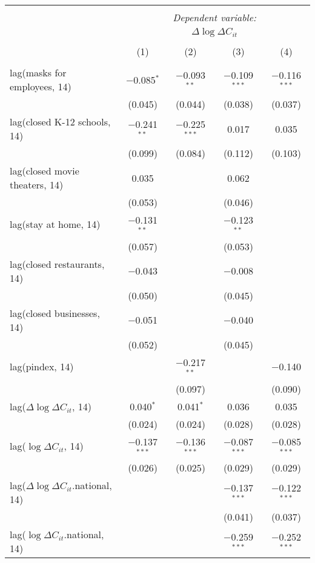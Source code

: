 \begin{tabular}{@{\extracolsep{1pt}}lcccc} 
\\[-1.8ex]\hline 
\hline \\[-1.8ex] 
 & \multicolumn{4}{c}{\textit{Dependent variable:}} \\ 
\cline{2-5} 
 & \multicolumn{4}{c}{$\Delta \log \Delta C_{it}$} \\ 
\\[-1.8ex] & (1) & (2) & (3) & (4)\\ 
\hline \\[-1.8ex] 
 lag(masks for employees, 14) & $-$0.085$^{*}$ & $-$0.093$^{**}$ & $-$0.109$^{***}$ & $-$0.116$^{***}$ \\ 
  & (0.045) & (0.044) & (0.038) & (0.037) \\ 
  lag(closed K-12 schools, 14) & $-$0.241$^{**}$ & $-$0.225$^{***}$ & 0.017 & 0.035 \\ 
  & (0.099) & (0.084) & (0.112) & (0.103) \\ 
  lag(closed movie theaters, 14) & 0.035 &  & 0.062 &  \\ 
  & (0.053) &  & (0.046) &  \\ 
  lag(stay at home, 14) & $-$0.131$^{**}$ &  & $-$0.123$^{**}$ &  \\ 
  & (0.057) &  & (0.053) &  \\ 
  lag(closed restaurants, 14) & $-$0.043 &  & $-$0.008 &  \\ 
  & (0.050) &  & (0.045) &  \\ 
  lag(closed businesses, 14) & $-$0.051 &  & $-$0.040 &  \\ 
  & (0.052) &  & (0.045) &  \\ 
  lag(pindex, 14) &  & $-$0.217$^{**}$ &  & $-$0.140 \\ 
  &  & (0.097) &  & (0.090) \\ 
  lag($\Delta \log \Delta C_{it}$, 14) & 0.040$^{*}$ & 0.041$^{*}$ & 0.036 & 0.035 \\ 
  & (0.024) & (0.024) & (0.028) & (0.028) \\ 
  lag($\log \Delta C_{it}$, 14) & $-$0.137$^{***}$ & $-$0.136$^{***}$ & $-$0.087$^{***}$ & $-$0.085$^{***}$ \\ 
  & (0.026) & (0.025) & (0.029) & (0.029) \\ 
  lag($\Delta \log \Delta C_{it}$.national, 14) &  &  & $-$0.137$^{***}$ & $-$0.122$^{***}$ \\ 
  &  &  & (0.041) & (0.037) \\ 
  lag($\log \Delta C_{it}$.national, 14) &  &  & $-$0.259$^{***}$ & $-$0.252$^{***}$ \\ 

\end{tabular}
